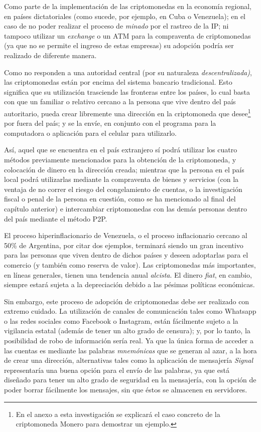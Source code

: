 \documentclass[12pt,a4paper,twoside]{book}
\begin{document}
Como parte de la implementación de las criptomonedas en la economía regional, en países dictatoriales (como sucede, por ejemplo, en Cuba o Venezuela); en el caso de no poder realizar el proceso de \textit{minado} por el rastreo de la IP; ni tampoco utilizar un \textit{exchange} o un ATM para la compraventa de criptomonedas (ya que no se permite el ingreso de estas empresas) su adopción podría ser realizado de diferente manera.

Como no responden a una autoridad central (por su naturaleza \textit{descentralizada)}, las criptomonedas están por encima del sistema bancario tradicional. Esto significa que su utilización trasciende las fronteras entre los países, lo cual basta con que un familiar o relativo cercano a la persona que vive dentro del país autoritario, pueda crear libremente una dirección en la criptomoneda que desee\footnote{En el anexo a esta investigación se explicará el caso concreto de la criptomoneda Monero para demostrar un ejemplo.} por fuera del país; y se la envíe, en conjunto con el programa para la computadora o aplicación para el celular para utilizarlo. 

Así, aquel que se encuentra en el país extranjero sí podrá utilizar los cuatro métodos previamente mencionados para la obtención de la criptomoneda, y colocación de dinero en la dirección creada; mientras que la persona en el país local podrá utilizarlas mediante la compraventa de bienes y servicios (con la ventaja de no correr el riesgo del congelamiento de cuentas, o la investigación fiscal o penal de la persona en cuestión, como se ha mencionado al final del capítulo anterior) e intercambiar criptomonedas con las demás personas dentro del país mediante el método P2P.

El proceso hiperinflacionario de Venezuela, o el proceso inflacionario cercano al 50\% de Argentina, por citar dos ejemplos, terminará siendo un gran incentivo para las personas que viven dentro de dichos países y deseen adoptarlas para el comercio (y también como reserva de valor). Las criptomonedas más importantes, en líneas generales, tienen una tendencia anual \textit{alcista}. El dinero \textit{fiat}, en cambio, siempre estará sujeta a la depreciación debido a las pésimas políticas económicas.

Sin embargo, este proceso de adopción de criptomonedas debe ser realizado con extremo cuidado. La utilización de canales de comunicación tales como Whatsapp o las redes sociales como Facebook o Instagram, están fácilmente sujeto a la vigilancia estatal (además de tener un alto grado de censura); y, por lo tanto, la posibilidad de robo de información sería real. Ya que la única forma de acceder a las cuentas es mediante las palabras \textit{mnemónicas} que se generan al azar, a la hora de crear una dirección, alternativas tales como la aplicación de mensajería \textit{Signal} representaría una buena opción para el envío de las palabras, ya que está diseñado para tener un alto grado de seguridad en la mensajería, con la opción de poder borrar fácilmente los mensajes, sin que éstos se almacenen en servidores.
\end{document}

